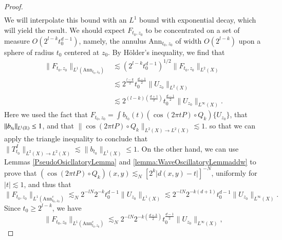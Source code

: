 \begin{proof}
\begin{equation}
\begin{split}
    \end{split}
    \end{equation}
    We will interpolate this bound with an $L^1$ bound with exponential decay, which will yield the result. We should expect $F_{t_0,z_0}$ to be concentrated on a set of measure $O( 2^{l-k} t_0^{d-1} )$, namely, the annulus $\text{Ann}_{t_0,z_0}$ of width $O(2^{l-k})$ upon a sphere of radius $t_0$ centered at $z_0$. By H\"{o}lder's inequality, we find that
    \begin{equation}
    \begin{split}
        \| F_{t_0,z_0} \|_{L^1(\text{Ann}_{t_0,z_0})} &\lesssim \left( 2^{l-k} t_0^{d-1} \right)^{1/2} \| F_{t_0,z_0} \|_{L^2(X)}\\
        &\lesssim 2^{\frac{l-k}{2}} t_0^{\frac{d-1}{2}} \| U_{z_0} \|_{L^2(X)}\\
        &\lesssim 2^{(l-k) \left( \frac{d+1}{2}\right)} t_0^{\frac{d-1}{2}} \| U_{z_0} \|_{L^\infty(X)}.
    \end{split}
    \end{equation}
    Here we used the fact that $F_{t_0,z_0} = \int b_{t_0}(t) ( \cos(2 \pi t P) \circ Q_k ) \{ U_{z_0} \}$, that $\| b_{t_0} \|_{L^1(\operatorname{\mathbb{R}})} \leq 1$,  and that $\| \cos(2 \pi t P) \circ Q_k \|_{L^2(X) \to L^2(X)} \lesssim 1$. so that we can apply the triangle inequality to conclude that $\| T_{t_0}^I \|_{L^2(X) \to L^2(X)} \lesssim \| b_{t_0} \|_{L^1(X)} \leq 1$. On the other hand, we can use Lemmas \ref{PseudoOsicllatoryLemma} and \ref{lemma:WaveOscillatoryLemmaddw} to prove that $(\cos(2 \pi t P) \circ Q_k)(x,y) \lesssim_N [2^k |d(x,y) - t|]^{-N}$, uniformly for $|t| \lesssim 1$, and thus that
    \begin{equation}
        \| F_{t_0,z_0} \|_{L^1(\text{Ann}_{t_0,z_0}^c)} \lesssim_N 2^{-lN} 2^{-k} t_0^{d-1} \| U_{z_0} \|_{L^1(X)} \lesssim 2^{-lN} 2^{-k(d+1)} t_0^{d-1} \| U_{z_0} \|_{L^\infty(X)}.
    \end{equation}
    Since $t_0 \geq 2^{l-k}$, we have
    \begin{equation}
        \| F_{t_0,z_0} \|_{L^1(\text{Ann}_{t_0,z_0}^c)} \lesssim_N 2^{-lN} 2^{-k \left( \frac{d+3}{2} \right)} t_0^{\frac{d-1}{2}} \| U_{z_0} \|_{L^\infty(X)},

\end{equation}
\end{proof}
